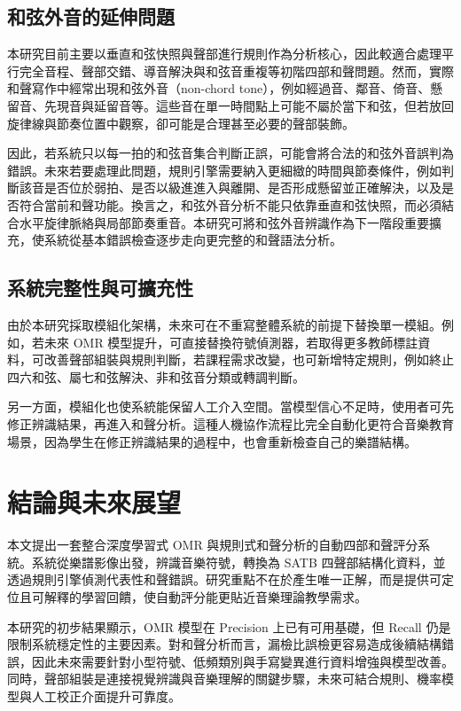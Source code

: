 \documentclass[12pt,a4paper]{article}
\begin{document}
\subsection{和弦外音的延伸問題}

本研究目前主要以垂直和弦快照與聲部進行規則作為分析核心，因此較適合處理平行完全音程、聲部交錯、導音解決與和弦音重複等初階四部和聲問題。然而，實際和聲寫作中經常出現和弦外音（non-chord tone），例如經過音、鄰音、倚音、懸留音、先現音與延留音等。這些音在單一時間點上可能不屬於當下和弦，但若放回旋律線與節奏位置中觀察，卻可能是合理甚至必要的聲部裝飾。

因此，若系統只以每一拍的和弦音集合判斷正誤，可能會將合法的和弦外音誤判為錯誤。未來若要處理此問題，規則引擎需要納入更細緻的時間與節奏條件，例如判斷該音是否位於弱拍、是否以級進進入與離開、是否形成懸留並正確解決，以及是否符合當前和聲功能。換言之，和弦外音分析不能只依靠垂直和弦快照，而必須結合水平旋律脈絡與局部節奏重音。本研究可將和弦外音辨識作為下一階段重要擴充，使系統從基本錯誤檢查逐步走向更完整的和聲語法分析。

\subsection{系統完整性與可擴充性}

由於本研究採取模組化架構，未來可在不重寫整體系統的前提下替換單一模組。例如，若未來 OMR 模型提升，可直接替換符號偵測器，若取得更多教師標註資料，可改善聲部組裝與規則判斷，若課程需求改變，也可新增特定規則，例如終止四六和弦、屬七和弦解決、非和弦音分類或轉調判斷。

另一方面，模組化也使系統能保留人工介入空間。當模型信心不足時，使用者可先修正辨識結果，再進入和聲分析。這種人機協作流程比完全自動化更符合音樂教育場景，因為學生在修正辨識結果的過程中，也會重新檢查自己的樂譜結構。

\section{結論與未來展望}

本文提出一套整合深度學習式 OMR 與規則式和聲分析的自動四部和聲評分系統。系統從樂譜影像出發，辨識音樂符號，轉換為 SATB 四聲部結構化資料，並透過規則引擎偵測代表性和聲錯誤。研究重點不在於產生唯一正解，而是提供可定位且可解釋的學習回饋，使自動評分能更貼近音樂理論教學需求。

本研究的初步結果顯示，OMR 模型在 Precision 上已有可用基礎，但 Recall 仍是限制系統穩定性的主要因素。對和聲分析而言，漏檢比誤檢更容易造成後續結構錯誤，因此未來需要針對小型符號、低頻類別與手寫變異進行資料增強與模型改善。同時，聲部組裝是連接視覺辨識與音樂理解的關鍵步驟，未來可結合規則、機率模型與人工校正介面提升可靠度。
\end{document}
